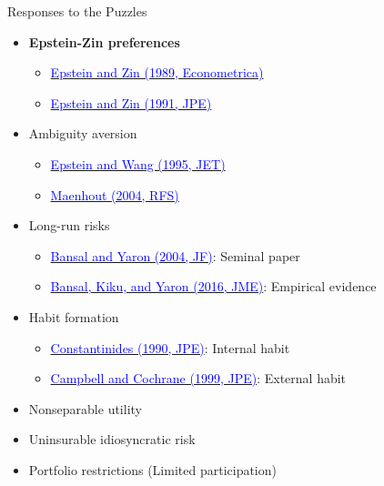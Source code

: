 \documentclass{beamer}
\begin{document}
\begin{frame}[allowframebreaks]{Responses to the Puzzles}
\begin{itemize}
\begin{itemize}
		\end{itemize}
		\item \textbf{Epstein-Zin preferences}
		\begin{itemize}
			\item \href{https://doi.org/10.2307/1913778}{\textcolor{blue}{Epstein and Zin (1989, Econometrica)}}
			\item \href{https://www.journals.uchicago.edu/doi/10.1086/261750}{\textcolor{blue}{Epstein and Zin (1991, JPE)}}
		\end{itemize}
		\item Ambiguity aversion
		\begin{itemize}
			\item \href{https://doi.org/10.1006/jeth.1995.1065}{\textcolor{blue}{Epstein and Wang (1995, JET)}}
			\item \href{https://doi.org/10.1093/rfs/hhh003}{\textcolor{blue}{Maenhout (2004, RFS)}}
		\end{itemize}
		\item Long-run risks
		\begin{itemize}
			\item \href{https://doi.org/10.1111/j.1540-6261.2004.00670.x}{\textcolor{blue}{Bansal and Yaron (2004, JF)}}: Seminal paper
			\item \href{https://doi.org/10.1016/j.jmoneco.2016.07.003}{\textcolor{blue}{Bansal, Kiku, and Yaron (2016, JME)}}: Empirical evidence
		\end{itemize}
		\item Habit formation
		\begin{itemize}
			\item \href{https://doi.org/10.1086/261693}{\textcolor{blue}{Constantinides (1990, JPE)}}: Internal habit
			\item \href{https://doi.org/10.1086/250059}{\textcolor{blue}{Campbell and Cochrane (1999, JPE)}}: External habit
		\end{itemize}
		\item Nonseparable utility

		\item Uninsurable idiosyncratic risk

		\item Portfolio restrictions (Limited participation)

	\end{itemize}
\end{frame}


\end{document}
